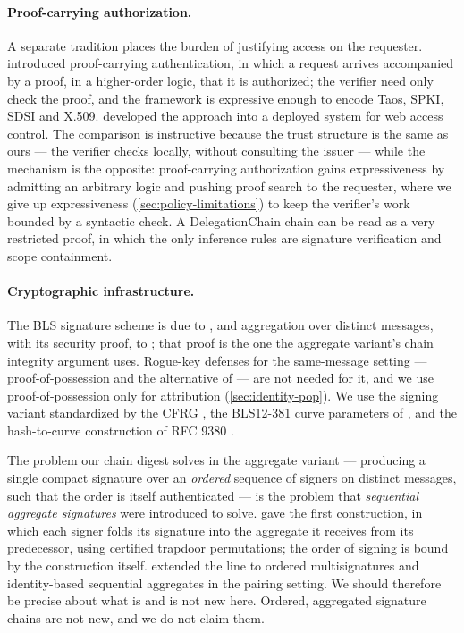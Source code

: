 \documentclass[11pt,a4paper]{article}
\begin{document}
\paragraph{Proof-carrying authorization.}
A separate tradition places the burden of justifying access on the
requester. \citet{appel1999pca} introduced proof-carrying
authentication, in which a request arrives accompanied by a proof, in a
higher-order logic, that it is authorized; the verifier need only check
the proof, and the framework is expressive enough to encode Taos, SPKI,
SDSI and X.509. \citet{bauer2003pca} developed the approach into a
deployed system for web access control. The comparison is instructive
because the trust structure is the same as ours --- the verifier checks
locally, without consulting the issuer --- while the mechanism is the
opposite: proof-carrying authorization gains expressiveness by admitting
an arbitrary logic and pushing proof search to the requester, where we
give up expressiveness (\cref{sec:policy-limitations}) to keep the
verifier's work bounded by a syntactic check. A DelegationChain chain
can be read as a very restricted proof, in which the only inference
rules are signature verification and scope containment.

\paragraph{Cryptographic infrastructure.}
The BLS signature scheme is due to \citet{boneh2001bls}, and aggregation
over distinct messages, with its security proof, to
\citet{bgls2003aggregate}; that proof is the one the aggregate
variant's chain integrity argument uses. Rogue-key defenses for the same-message setting ---
proof-of-possession \citep{ristenpart2007pop} and the alternative of
\citet{boneh2018compact} --- are not needed for it, and we use
proof-of-possession only for attribution (\cref{sec:identity-pop}). We use the signing variant standardized by the
CFRG \citep{ietf-bls-signature}, the BLS12-381 curve parameters of
\citet{ietf-pairing-curves}, and the hash-to-curve construction of
RFC 9380 \citep{rfc9380}.

The problem our chain digest solves in the aggregate variant ---
producing a single compact signature over an \emph{ordered} sequence of
signers on distinct
messages, such that the order is itself authenticated --- is the problem
that \emph{sequential aggregate signatures} were introduced to solve.
\citet{lmrs2004seqagg} gave the first construction, in which each signer
folds its signature into the aggregate it receives from its predecessor,
using certified trapdoor permutations; the order of signing is bound by
the construction itself. \citet{boldyreva2007ordered} extended the line
to ordered multisignatures and identity-based sequential aggregates in
the pairing setting. We should therefore be precise about what is and is
not new here. Ordered, aggregated signature chains are not new, and we
do not claim them.
\end{document}
